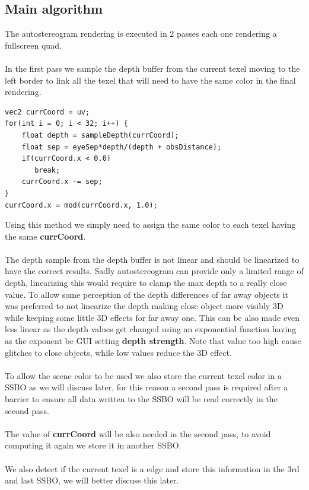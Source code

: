 \documentclass[12pt, a4paper]{article}
\begin{document}
\subsection{Main algorithm}
The autostereogram rendering is executed in 2 passes each one rendering a fullscreen quad.\\\\
In the first pass we sample the depth buffer from the current texel moving to the left border to link
all the texel that will need to have the same color in the final rendering.
\begin{lstlisting}[caption={Autostereogram depth sampling},captionpos=b]
vec2 currCoord = uv;
for(int i = 0; i < 32; i++) {
    float depth = sampleDepth(currCoord);
    float sep = eyeSep*depth/(depth + obsDistance);
    if(currCoord.x < 0.0)
       break;
    currCoord.x -= sep;
}
currCoord.x = mod(currCoord.x, 1.0);
\end{lstlisting}
Using this method we simply need to assign the same color to each texel having the same \textbf{currCoord}.\\\\
The depth sample from the depth buffer is not linear and should be linearized to have the correct results.
Sadly autostereogram can provide only a limited range of depth, linearizing this would require to clamp the max depth
to a really close value. To allow some perception of the depth differences of far away objects it was preferred to not linearize
the depth making close object more visibly 3D while keeping some little 3D effects for far away one. This can be also made even less linear
as the depth values get changed using an exponential function having as the exponent be GUI setting \textbf{depth strength}. Note that value too high
cause glitches to close objects, while low values reduce the 3D effect.\\\\
To allow the scene color to be used we also store the current texel color in a SSBO as we will discuss later, for this
reason a second pass is required after a barrier to ensure all data written to the SSBO will be read correctly in the second pass.\\\\
The value of \textbf{currCoord} will be also needed in the second pass, to avoid computing it again we store it in another SSBO.\\\\
We also detect if the current texel is a edge and store this information in the 3rd and last SSBO, we will better discuss this later.
\end{document}
